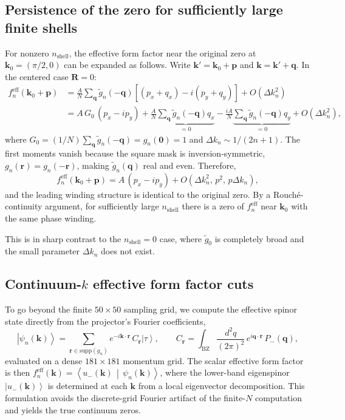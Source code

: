 \documentclass[aps,prb,onecolumn,nofootinbib,superscriptaddress]{revtex4-2}
\newcommand{\mbf}[1]{\mathbf{#1}}
\newcommand{\ket}[1]{\left|#1\right\rangle}
\newcommand{\braket}[2]{\left\langle#1\,\middle|\,#2\right\rangle}
\begin{document}
\subsection{Persistence of the zero for sufficiently large finite shells}
\label{sec:persistence}

For nonzero $n_{\mathrm{shell}}$, the effective form factor near the original zero at $\mbf{k}_0=(\pi/2,0)$ can be expanded as follows. Write $\mbf{k}'=\mbf{k}_0+\mbf{p}$ and $\mbf{k}=\mbf{k}'+\mbf{q}$. In the centered case $\mbf{R}=0$:
\begin{align}
f_n^{\mathrm{eff}}(\mbf{k}_0+\mbf{p}) &= \frac{A}{N}\sum_{\mbf{q}}\widetilde{g}_n(-\mbf{q})\left[(p_x+q_x)-i(p_y+q_y)\right]+O(\Delta k_n^2) \nonumber\\
&= A\,G_0\,(p_x-ip_y) + \frac{A}{N}\underbrace{\sum_{\mbf{q}}\widetilde{g}_n(-\mbf{q})q_x}_{=0} - \frac{iA}{N}\underbrace{\sum_{\mbf{q}}\widetilde{g}_n(-\mbf{q})q_y}_{=0} + O(\Delta k_n^2),
\label{eq:finite_shell_zero_survival}
\end{align}
where $G_0 = (1/N)\sum_{\mbf{q}}\widetilde{g}_n(-\mbf{q})=g_n(\mbf{0})=1$ and $\Delta k_n\sim 1/(2n+1)$. The first moments vanish because the square mask is inversion-symmetric, $g_n(\mbf{r})=g_n(-\mbf{r})$, making $\widetilde{g}_n(\mbf{q})$ real and even. Therefore,
\begin{equation}
f_n^{\mathrm{eff}}(\mbf{k}_0+\mbf{p}) = A\,(p_x-ip_y)+O(\Delta k_n^2,\,p^2,\,p\Delta k_n),
\end{equation}
and the leading winding structure is identical to the original zero. By a Rouch\'{e}-continuity argument, for sufficiently large $n_{\mathrm{shell}}$ there is a zero of $f_n^{\mathrm{eff}}$ near $\mbf{k}_0$ with the same phase winding.

This is in sharp contrast to the $n_{\mathrm{shell}}=0$ case, where $\widetilde{g}_0$ is completely broad and the small parameter $\Delta k_n$ does not exist.

\subsection{Continuum-\texorpdfstring{$k$}{k} effective form factor cuts}

To go beyond the finite $50\times 50$ sampling grid, we compute the effective spinor state directly from the projector's Fourier coefficients,
\begin{equation}
\ket{\psi_n(\mbf{k})} = \sum_{\mbf{r}\in\mathrm{supp}(g_n)} e^{-i\mbf{k}\cdot\mbf{r}}\,C_{\mbf{r}}\ket{\tau},
\qquad
C_{\mbf{r}} = \int_{\mathrm{BZ}}\frac{d^2q}{(2\pi)^2}\,e^{i\mbf{q}\cdot\mbf{r}}\,P_-(\mbf{q}),
\label{eq:spinor_continuum}
\end{equation}
evaluated on a dense $181\times 181$ momentum grid. The scalar effective form factor is then $f_n^{\mathrm{eff}}(\mbf{k}) = \braket{u_-(\mbf{k})}{\psi_n(\mbf{k})}$, where the lower-band eigenspinor $\ket{u_-(\mbf{k})}$ is determined at each $\mbf{k}$ from a local eigenvector decomposition. This formulation avoids the discrete-grid Fourier artifact of the finite-$N$ computation and yields the true continuum zeros.
\end{document}
